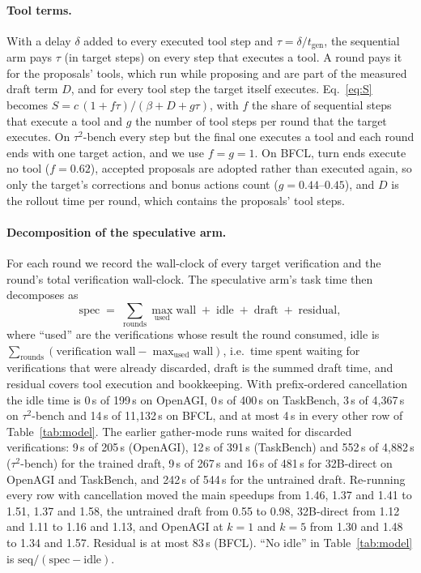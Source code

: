 \paragraph{Tool terms.}
With a delay $\delta$ added to every executed tool step and $\tau = \delta / t_{\mathrm{gen}}$, the sequential
arm pays $\tau$ (in target steps) on every step that executes a tool. A round pays it for the proposals' tools,
which run while proposing and are part of the measured draft term $D$, and for every tool step the target
itself executes. Eq.~\ref{eq:S} becomes $S = c\,(1 + f\tau) / (\beta + D + g\tau)$, with $f$ the share of
sequential steps that execute a tool and $g$ the number of tool steps per round that the target executes. On
$\tau^2$-bench every step but the final one executes a tool and each round ends with one target action, and we
use $f = g = 1$. On BFCL, turn ends execute no tool ($f = 0.62$), accepted proposals are adopted rather than
executed again, so only the target's corrections and bonus actions count ($g = 0.44$--$0.45$), and $D$ is the
rollout time per round, which contains the proposals' tool steps.

\paragraph{Decomposition of the speculative arm.}
For each round we record the wall-clock of every target verification and the
round's total verification wall-clock. The speculative arm's task time then
decomposes as
\[
  \text{spec} \;=\; \sum_{\text{rounds}} \max_{\text{used}} \text{wall}
  \;+\; \text{idle} \;+\; \text{draft} \;+\; \text{residual},
\]
where ``used'' are the verifications whose result the round consumed, idle is
$\sum_{\text{rounds}} (\text{verification wall} - \max_{\text{used}}
\text{wall})$, i.e.\ time spent waiting for verifications that were already
discarded, draft is the summed draft time, and residual covers tool execution
and bookkeeping. With prefix-ordered cancellation the idle time is 0\,s of
199\,s on OpenAGI, 0\,s of 400\,s on TaskBench, 3\,s of 4{,}367\,s on $\tau^2$-bench
and 14\,s of 11{,}132\,s on BFCL, and at most 4\,s in every other row of Table~\ref{tab:model}.
The earlier gather-mode runs waited for discarded verifications: 9\,s of 205\,s (OpenAGI), 12\,s of
391\,s (TaskBench) and 552\,s of 4{,}882\,s ($\tau^2$-bench) for the trained draft, 9\,s of 267\,s and 16\,s
of 481\,s for 32B-direct on OpenAGI and TaskBench, and 242\,s of 544\,s for the untrained draft.
Re-running every row with cancellation moved the main speedups from 1.46, 1.37 and 1.41\xx{} to 1.51, 1.37
and 1.58\xx{}, the untrained draft from 0.55\xx{} to 0.98\xx{}, 32B-direct from 1.12 and 1.11\xx{} to 1.16
and 1.13\xx{}, and OpenAGI at $k{=}1$ and $k{=}5$ from 1.30 and 1.48\xx{} to 1.34 and 1.57\xx{}. Residual
is at most 83\,s (BFCL). ``No idle'' in Table~\ref{tab:model} is
$\text{seq} / (\text{spec} - \text{idle})$.

